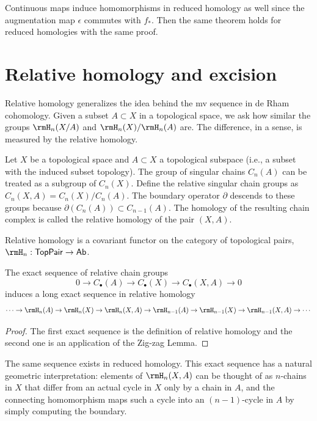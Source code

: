 Continuous maps induce homomorphisms in reduced homology as well since the augmentation map $\epsilon$ commutes with $f_\ast$. Then the same theorem holds for reduced homologies with the same proof.




\section{Relative homology and excision}

Relative homology generalizes the idea behind the \gls{mv} sequence in de Rham cohomology. Given a subset $A\subset X$ in a topological space, we ask how similar the groups $\rmH_n(X/A)$ and $\rmH_n(X)/\rmH_n(A)$ are. The difference, in a sense, is measured by the relative homology.

\begin{defn}
    Let $X$ be a topological space and $A\subset X$ a topological subspace (i.e., a subset with the induced subset topology). The group of singular chains $C_n(A)$ can be treated as a subgroup of $C_n(X)$. Define the relative singular chain groups as $C_n(X,A)=C_n(X)/C_n(A)$. The boundary operator $\partial$ descends to these groups because $\partial(C_n(A))\subset C_{n-1}(A)$. The homology of the resulting chain complex is called the relative homology of the pair $(X,A)$.
\end{defn}

Relative homology is a covariant functor on the category of topological pairs, $\rmH_n:\mathsf{TopPair}\to \mathsf{Ab}$.

\begin{prop}\label{exact seq of a pair}
    The exact sequence of relative chain groups
    \[0\to C_\bullet(A)\to C_\bullet (X)\to C_\bullet(X,A)\to 0 \]
    induces a long exact sequence in relative homology
    \[\cdots \to \rmH_n(A)\to \rmH_n(X)\to \rmH_n(X,A)\to \rmH_{n-1}(A)\to \rmH_{n-1}(X)\to \rmH_{n-1}(X,A)\to \cdots\]
\end{prop}
\begin{proof}
     The first exact sequence is the definition of relative homology and the second one is an application of the Zig-zag Lemma.
\end{proof}

The same sequence exists in reduced homology. This exact sequence has a natural geometric interpretation: elements of $\rmH_n(X,A)$ can be thought of as $n$-chains in $X$ that differ from an actual cycle in $X$ only by a chain in $A$, and the connecting homomorphism maps such a cycle into an $(n-1)$-cycle in $A$ by simply computing the boundary.

